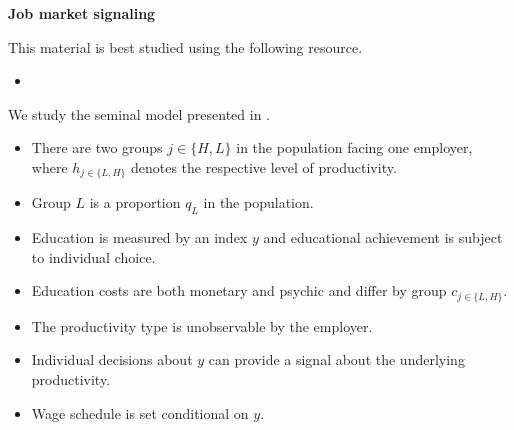 \begin{frame}\begin{center}
		\LARGE\textbf{Job market signaling}
\end{center}\end{frame}
\begin{frame} This material is best studied using the following resource.\\\vspace{0.3cm}

\begin{itemize}
\item {}
\end{itemize}

\end{frame}
\begin{frame}

We study the seminal model presented in .
\begin{itemize}\setlength\itemsep{1em}
\item There are two groups $j \in\{H, L\}$ in the population facing one employer, where  $h_{j\in\{L, H\}}$ denotes the respective level of productivity.
\item Group $L$ is a proportion $q_L$ in the population.
\item Education is measured by an index $y$ and educational achievement is subject to individual choice.
\item Education costs are both monetary and psychic and differ by group $c_{j\in\{L, H\}}$.
\end{itemize}

\end{frame}

\begin{frame}

\begin{itemize}\setlength\itemsep{1em}
\item The productivity type is unobservable by the employer.
\item Individual decisions about $y$ can provide a signal about the underlying productivity.
\item Wage schedule is set conditional on $y$.
\end{itemize}
\end{frame}

